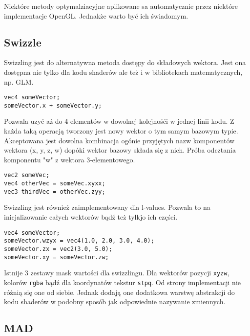Niektóre metody optymalziacyjne aplikowane sa automatycznie przez niektóre implementacje OpenGL. Jednakże warto być ich świadomym.

\subsection{Swizzle}
\thispagestyle{empty}
\par\indent

Swizzling jest do alternatywna metoda dostępy do składowych wektora. Jest ona dostępna nie tylko dla kodu shaderów ale też i w bibliotekach matematycznych, np. GLM.

\begin{lstlisting}[caption=Swizzling użyty pośrednio]
vec4 someVector;
someVector.x + someVector.y;
\end{lstlisting}

Pozwala uzyć aż do 4 elementów w dowolnej kolejnośći w jednej linii kodu. Z każda taką operacją tworzony jest nowy wektor o tym samym bazowym typie. Akceptowana jest dowolna kombinacja ogónie przyjętych nazw komponentów wektora (x, y, z, w) dopóki wektor bazowy składa się z nich. Próba odcztania komponentu "w" z wektora 3-elementowego.

\begin{lstlisting}[caption=Swizzling użyty bezpośrednio]
vec2 someVec;
vec4 otherVec = someVec.xyxx;
vec3 thirdVec = otherVec.zyy;
\end{lstlisting}

Swizzling jest również zaimplementowany dla l-values. Pozwala to na inicjalizowanie całych wektorów bądź też tylkjo ich części.

\begin{lstlisting}[caption=Swizzling użyty to przypisania wartości wektorom]
vec4 someVector;
someVector.wzyx = vec4(1.0, 2.0, 3.0, 4.0);
someVector.zx = vec2(3.0, 5.0);
someVector.xy = someVector.zw;
\end{lstlisting}

Istnije 3 zestawy mask wartości dla swizzlingu. Dla wektorów pozycji \texttt{xyzw}, kolorów \texttt{rgba} bądź dla koordynatów tekstur \texttt{stpq}. Od strony implementacji nie różnią się one od siebie. Jednak dodają one dodatkowa warstwę abstrakcji do kodu shaderów w podobny sposób jak odpowiednie nazywanie zmiennych.

\subsection{MAD}
\thispagestyle{empty}
\par\indent

